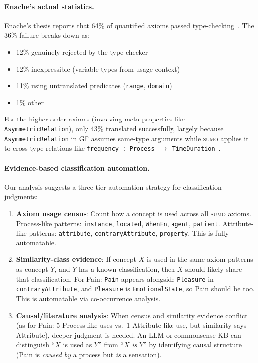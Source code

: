 \documentclass[11pt]{article}
\newcommand{\SUMO}{\textsc{sumo}}
\theoremstyle{definition}
\theoremstyle{plain}
\begin{document}
\paragraph{Enache's actual statistics.}
Enache's thesis reports that 64\% of quantified axioms passed
type-checking~\cite{enache2012sumogf}.  The 36\% failure breaks down as:
\begin{itemize}[nosep]
  \item 12\% genuinely rejected by the type checker
  \item 12\% inexpressible (variable types from usage context)
  \item 11\% using untranslated predicates (\texttt{range},
    \texttt{domain})
  \item 1\% other
\end{itemize}
For the higher-order axioms (involving meta-properties like
\texttt{AsymmetricRelation}), only 43\% translated successfully,
largely because \texttt{AsymmetricRelation} in GF assumes same-type
arguments while \SUMO{} applies it to cross-type relations like
\texttt{frequency : Process $\to$ TimeDuration}~\cite{enache2012sumogf}.

\paragraph{Evidence-based classification automation.}
\label{par:evidence-classify}
Our analysis suggests a three-tier automation strategy for
classification judgments:

\begin{enumerate}[nosep]
  \item \textbf{Axiom usage census}: Count how a concept is used
    across all \SUMO{} axioms.  Process-like patterns:
    \texttt{instance}, \texttt{located}, \texttt{WhenFn},
    \texttt{agent}, \texttt{patient}.  Attribute-like patterns:
    \texttt{attribute}, \texttt{contraryAttribute},
    \texttt{property}.  This is fully automatable.

  \item \textbf{Similarity-class evidence}: If concept $X$ is used
    in the same axiom patterns as concept $Y$, and $Y$ has a known
    classification, then $X$ should likely share that classification.
    For Pain: \texttt{Pain} appears alongside \texttt{Pleasure} in
    \texttt{contraryAttribute}, and \texttt{Pleasure} is
    \texttt{EmotionalState}, so Pain should be too.  This is
    automatable via co-occurrence analysis.

  \item \textbf{Causal/literature analysis}: When census and
    similarity evidence conflict (as for Pain: 5 Process-like uses
    vs.\ 1 Attribute-like use, but similarity says Attribute),
    deeper judgment is needed.  An LLM or commonsense KB can
    distinguish ``$X$ is used as $Y$'' from ``$X$ \emph{is} $Y$''
    by identifying causal structure (Pain is \emph{caused by} a
    process but \emph{is} a sensation).
\end{enumerate}
\end{document}
